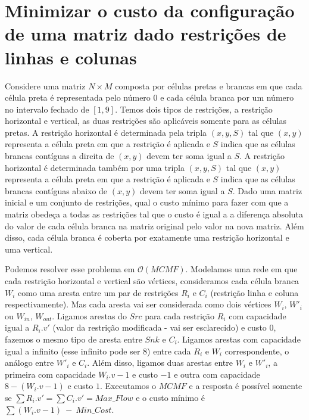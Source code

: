 
\section{Minimizar o custo da configuração de uma matriz dado restrições de linhas e colunas}
Considere uma matriz $N\times M$ composta por células pretas e brancas em que cada célula preta é representada pelo número $0$ e cada célula branca por um número no intervalo fechado de $[1,9]$. Temos dois tipos de restrições, a restrição horizontal e vertical, as duas restrições são aplicáveis somente para as células pretas. A restrição horizontal é determinada pela tripla $(x,y,S)$ tal que $(x,y)$ representa a célula preta em que a restrição é aplicada e $S$ indica que as células brancas contíguas a direita de $(x,y)$ devem ter soma igual a $S$. A restrição horizontal é determinada também por uma tripla $(x,y,S)$ tal que $(x,y)$ representa a célula preta em que a restrição é aplicada e $S$ indica que as células brancas contíguas abaixo de $(x,y)$ devem ter soma igual a $S$. Dado uma matriz inicial e um conjunto de restrições, qual o custo mínimo para fazer com que a matriz obedeça a todas as restrições tal que o custo é igual a a diferença absoluta do valor de cada célula branca na matriz original pelo valor na nova matriz. Além disso, cada célula branca é coberta por exatamente uma restrição horizontal e uma vertical.

Podemos resolver esse problema em $\mathcal{O}(MCMF)$. Modelamos uma rede em que cada restrição horizontal e vertical são vértices, consideramos cada célula branca $W_i$ como uma aresta entre um par de restrições $R_i$ e $C_i$ (restrição linha e coluna respectivamente). Mas cada aresta vai ser considerada como dois vértices $W_i$, $W'_i$ ou $W_{in}$, $W_{out}$. Ligamos arestas do $Src$ para cada restrição $R_i$ com capacidade igual a $R_i.v'$ (valor da restrição modificada - vai ser esclarecido) e custo $0$, fazemos o mesmo tipo de aresta entre $Snk$ e $C_i$. Ligamos arestas com capacidade igual a infinito (esse infinito pode ser $8$) entre cada $R_i$ e $W_i$ correspondente, o análogo entre $W'_i$ e $C_i$. Além disso, ligamos duas arestas entre $W_i$ e $W'_i$, a primeira com capacidade $W_i.v-1$ e custo $-1$ e outra com capacidade $8 - (W_i.v-1)$ e custo $1$. Executamos o $MCMF$ e a resposta é possível somente se $\sum R_i.v' = \sum C_i.v' = Max\_Flow$ e o custo mínimo é $\sum (W_i.v -1) ~-~ Min\_Cost$.

